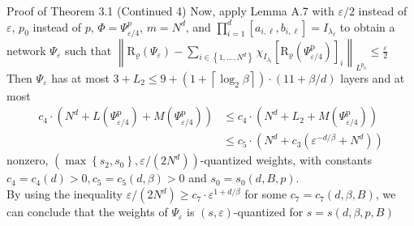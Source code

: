 \documentclass{if-beamer}
\begin{document}
\begin{frame}{Proof of Theorem 3.1 (Continued 4)}
    Now, apply Lemma A.7 with $\varepsilon/2$ instead of $\varepsilon$, $p_0$ instead of $p$, $\Phi = \Psi^p_{\varepsilon/4}$, $m=N^d$, and $\prod_{i=1}^{d}\left[a_{i, \ell}, b_{i, \ell}\right] = I_{\lambda_{\ell}}$ to obtain a network $\Psi_{\varepsilon}$ such that $\left\|\mathrm{R}_{\varrho}\left(\Psi_{\varepsilon}\right)-\sum_{i \in\left\{1, \ldots, N^{d}\right\}} \chi_{I_{\lambda_{i}}}\left[\mathrm{R}_{\varrho}\left(\Psi_{\varepsilon / 4}^{\mathrm{p}}\right)\right]_{i}\right\|_{L^{p_{0}}} \leq \frac{\varepsilon}{2}$\\
    Then $\Psi_{\varepsilon}$ has at most $3 + L_2 \leq 9 + \left(1+\left\lceil\log _{2} \beta\right\rceil\right)\cdot(11+\beta / d)$ layers and at most 
    \begin{align*}
        c_{4} \cdot\left(N^{d}+L\left(\Psi_{\varepsilon / 4}^{\mathrm{p}}\right)+M\left(\Psi_{\varepsilon / 4}^{\mathrm{p}}\right)\right) &\leq c_{4} \cdot\left(N^{d}+L_{2}+M\left(\Psi_{\varepsilon / 4}^{\mathrm{p}}\right)\right)\\ &\leq c_{5} \cdot\left(N^{d}+c_{3}\left(\varepsilon^{-d / \beta}+N^{d}\right)\right)
    \end{align*}
    nonzero, $\left(\max \left\{s_{2}, s_{0}\right\}, \varepsilon /\left(2 N^{d}\right)\right)$-quantized weights, with constants $c_{4}=c_{4}(d)>0, c_{5}=c_{5}(d, \beta)>0$ and $s_0=s_0(d,B,p)$.\\
    By using the inequality $\varepsilon/(2N^d) \geq c_7\cdot \varepsilon^{1+d/\beta}$ for some $c_7 = c_7(d,\beta,B)$, we can conclude that the weights of $\Psi_{\varepsilon}$ is $(s,\varepsilon)$-quantized for $s=s(d,\beta,p,B)$
\end{frame}
\end{document}
